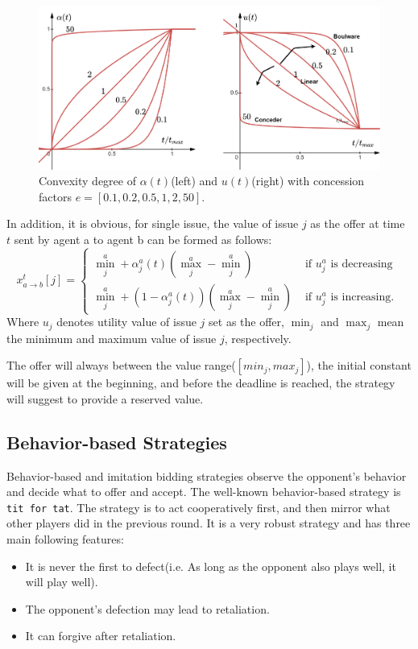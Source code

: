 \begin{figure}
\centering
\includegraphics[width=1.0\textwidth]{./images/conceder-boulware-combination.png}
\caption{Convexity degree of $\alpha(t)$(left) and $u(t)$(right) with concession factors $e=[0.1, 0.2, 0.5, 1, 2, 50]$.}
\label{fig:boulware-conceder-combination}
\end{figure}

In addition, it is obvious, for single issue, the value of issue $j$ as the offer at time $t$ sent by agent a to agent b can be formed as follows:
\begin{equation}
x_{a \rightarrow b}^{t}[j]=\left\{\begin{array}{ll}
\min _{j}^{a}+\alpha_{j}^{a}(t)\left(\max _{j}^{a}-\min _{j}^{a}\right) & \text { if } u_{j}^{a} \text { is decreasing } \\
\min _{j}^{a}+\left(1-\alpha_{j}^{a}(t)\right)\left(\max _{j}^{a}-\min _{j}^{a}\right) & \text { if } u_{j}^{a} \text { is increasing. }
\end{array}\right.
\end{equation}
Where $u_{j}$ denotes utility value of issue $j$ set as the offer, $\min _{j}$ and $\max _{j}$ mean the minimum and maximum value of issue $j$, respectively.


The offer will always between the value range($[min_j, max_j]$), the initial constant will be given at the beginning, and before the deadline is reached, the strategy will suggest to provide a reserved value.

\subsection{Behavior-based Strategies}
Behavior-based and imitation bidding strategies observe the opponent's behavior and decide what to offer and accept. The well-known behavior-based strategy is \texttt{tit for tat}. The strategy is to act cooperatively first, and then mirror what other players did in the previous round.
It is a very robust strategy and has three main following features\parencite{Baarslag2013, chang2020multiissue}:
\begin{itemize}
\item It is never the first to defect(i.e. As long as the opponent also plays well, it will play well).
\item The opponent's defection may lead to retaliation.
\item It can forgive after retaliation.
\end{itemize}

